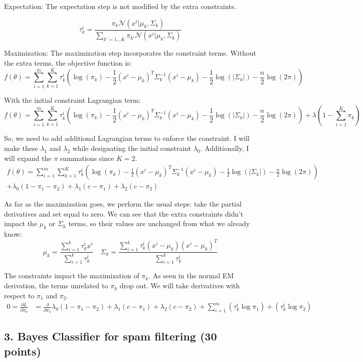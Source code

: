 \documentclass[12pt]{article}
\begin{document}
Expectation: The expectation step is not modified by the extra constraints.

\[
    \tau_k^i = \frac{\pi_k \mathcal{N}(x^i | \mu_k,\Sigma_k)}{\sum_{k'=1...K}\pi_{k'}\mathcal{N}(x^i | \mu_k,\Sigma_k)}
\]

Maximization: The maximization step incorporates the constraint terms. Without the extra terms, the objective function is:
\[
    f(\theta) = \sum_{i=1}^m \sum_{k=1}^K \tau_k^i(\log(\pi_k) - \frac{1}{2}(x^i-\mu_k)^T \Sigma_k^{-1}(x^i-\mu_k)-\frac{1}{2}\log(|\Sigma_k|)-\frac{n}{2}\log(2\pi))
\]

With the initial constraint Lagrangian term:
\[
    f(\theta) = \sum_{i=1}^m \sum_{k=1}^K \tau_k^i(\log(\pi_k) - \frac{1}{2}(x^i-\mu_k)^T \Sigma_k^{-1}(x^i-\mu_k)-\frac{1}{2}\log(|\Sigma_k|)-\frac{n}{2}\log(2\pi)) + \lambda(1-\sum_{i=1}^K \pi_k)
\]

So, we need to add additional Lagrangian terms to enforce the constraint. I will make these $\lambda_1$ and $\lambda_2$ while designating the initial constraint $\lambda_0$. Additionally, I will expand the $\pi$ summations since $K=2$.
\begin{align*}
    f(\theta) = \sum_{i=1}^m \sum_{k=1}^K \tau_k^i(\log(\pi_k) - \frac{1}{2}(x^i-\mu_k)^T \Sigma_k^{-1}(x^i-\mu_k)-\frac{1}{2}\log(|\Sigma_k|)-\frac{n}{2}\log(2\pi)) \\+ \lambda_0(1 - \pi_1 - \pi_2 ) + \lambda_1(c-\pi_1) + \lambda_2(c-\pi_2)
\end{align*}

As far as the maximization goes, we perform the usual steps: take the partial derivatives and set equal to zero. We can see that the extra constraints didn't impact the $\mu_k$ or $\Sigma_k$ terms, so their values are unchanged from what we already know:
\[
    \mu_k=\frac{\sum_{i=1}^k \tau_k^i x^i}{\sum_{i=1}^k \tau_k^i} \quad
    \Sigma_k=\frac{\sum_{i=1}^k \tau_k^i(x^i-\mu_k)(x^i-\mu_k)^T}{\sum_{i=1}^k \tau_k^i}
\]

The constraints impact the maximization of $\pi_k$. As seen in the normal EM derivation, the terms unrelated to $\pi_k$ drop out. We will take derivatives with respect to $\pi_1$ and $\pi_2$.
\begin{align*}
    0 =\frac{\partial L}{\partial \pi_k} &= \frac{\partial}{\partial \pi_k}\lambda_0(1 - \pi_1 - \pi_2 ) + \lambda_1(c-\pi_1) + \lambda_2(c-\pi_2) + \sum_{i=1}^m (\tau_k^i\log\pi_1)+(\tau_k^i\log\pi_2)
\end{align*}

\subsection*{3. Bayes Classifier for spam filtering (30 points)} 
\end{document}
